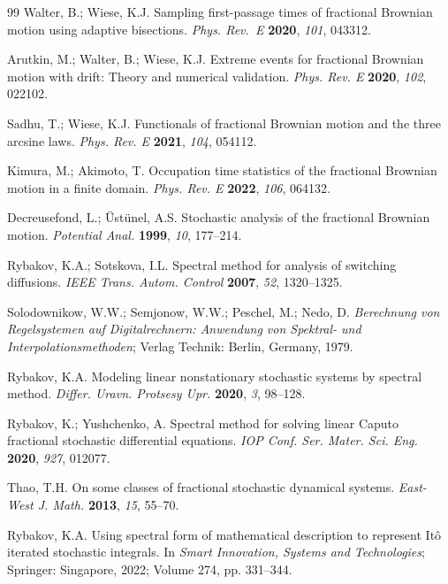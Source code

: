 \documentclass[10pt,reqno]{amsart}
\theoremstyle{plain}
\theoremstyle{remark}
\begin{document}
\begin{thebibliography}{99}
Walter, B.; Wiese, K.J. Sampling first-passage times of fractional Brownian motion using adaptive bisections. {\em Phys. Rev.~E} {\bf 2020}, {\em 101}, 043312.

Arutkin, M.; Walter, B.; Wiese, K.J. Extreme events for fractional Brownian motion with drift: Theory and numerical validation. {\em Phys. Rev. E} {\bf 2020}, {\em 102}, 022102.

Sadhu, T.; Wiese, K.J. Functionals of fractional Brownian motion and the three arcsine laws. {\em Phys. Rev. E} {\bf 2021}, {\em 104}, 054112.

Kimura, M.; Akimoto, T. Occupation time statistics of the fractional Brownian motion in a finite domain. {\em Phys. Rev. E} {\bf 2022}, {\em 106}, 064132.

Decreusefond, L.; \"{U}st\"{u}nel, A.S. Stochastic analysis of the fractional Brownian motion. {\em Potential Anal.} {\bf 1999}, {\em 10}, 177--214.

Rybakov, K.A.; Sotskova, I.L. Spectral method for analysis of switching diffusions. {\em IEEE Trans. Autom. Control} {\bf 2007}, {\em 52}, 1320--1325.

Solodownikow, W.W.; Semjonow, W.W.; Peschel, M.; Nedo, D. {\em Berechnung von Regelsystemen auf Digitalrechnern: Anwendung von Spektral- und Interpolationsmethoden}; Verlag Technik: Berlin, Germany, 1979.

Rybakov, K.A. Modeling linear nonstationary stochastic systems by spectral method. {\em Differ. Uravn. Protsesy Upr.} {\bf 2020}, {\em 3}, 98--128.

Rybakov, K.; Yushchenko, A. Spectral method for solving linear Caputo fractional stochastic differential equations. {\em IOP Conf. Ser. Mater. Sci. Eng.} {\bf 2020}, {\em 927}, 012077.

Thao, T.H. On some classes of fractional stochastic dynamical systems. {\em East-West J. Math.} {\bf 2013}, {\em 15}, 55--70.

Rybakov, K.A. Using spectral form of mathematical description to represent It\^{o} iterated stochastic integrals. In {\em Smart Innovation, Systems and Technologies}; Springer: Singapore, 2022; Volume 274, pp. 331--344.


\end{thebibliography}
\end{document}
